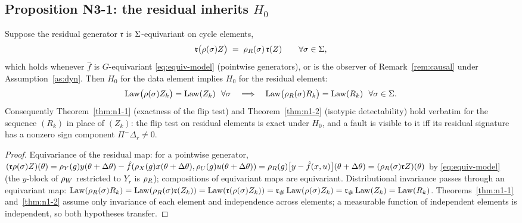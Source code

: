 \subsection{Proposition N3-1: the residual inherits \texorpdfstring{$H_0$}{H0}}
\label{sec:p2-n31}

\begin{proposition}
\label{prop:residual-h0}
Suppose the residual generator $\mathfrak{r}$ is $\Sigma$-equivariant on
cycle elements,
\begin{equation}
  \label{eq:r-equiv}
  \mathfrak{r}\bigl(\rho(\sigma) Z\bigr) \;=\; \rho_R(\sigma)\, \mathfrak{r}(Z)
  \qquad \forall \sigma \in \Sigma,
\end{equation}
which holds whenever $\hat f$ is $G$-equivariant \eqref{eq:equiv-model}
(pointwise generators), or is the observer of Remark~\ref{rem:causal} under
Assumption~\ref{as:dyn}. Then $H_0$ for the data element implies $H_0$ for
the residual element:
\begin{equation}
  \label{eq:h0-residual}
  \operatorname{Law}\bigl(\rho(\sigma) Z_k\bigr) = \operatorname{Law}(Z_k)\ \ \forall \sigma
  \quad\Longrightarrow\quad
  \operatorname{Law}\bigl(\rho_R(\sigma) R_k\bigr) = \operatorname{Law}(R_k)\ \ \forall \sigma \in \Sigma .
\end{equation}
Consequently Theorem~\ref{thm:n1-1} (exactness of the flip test) and
Theorem~\ref{thm:n1-2} (isotypic detectability) hold verbatim for the
sequence $(R_k)$ in place of $(Z_k)$: the flip test on residual elements is
exact under $H_0$, and a fault is visible to it iff its residual signature
has a nonzero sign component $\Pi^{-}\Delta_r \neq 0$.
\end{proposition}

\begin{proof}
Equivariance of the residual map: for a pointwise generator,
$(\mathfrak{r}\rho(\sigma)Z)(\theta) = \rho_{Y}(g) y(\theta+\Delta\theta) -
\hat f(\rho_{X}(g)x(\theta+\Delta\theta), \rho_{U}(g)u(\theta+\Delta\theta)) =
\rho_{R}(g)\bigl[y - \hat f(x,u)\bigr](\theta+\Delta\theta) =
(\rho_R(\sigma)\mathfrak{r}Z)(\theta)$ by \eqref{eq:equiv-model} (the
$y$-block of $\rho_{W}$ restricted to $Y_r$ is $\rho_{R}$); compositions of
equivariant maps are equivariant. Distributional invariance passes through
an equivariant map: $\operatorname{Law}(\rho_R(\sigma)R_k) = \operatorname{Law}(\rho_R(\sigma)\mathfrak{r}(Z_k))
= \operatorname{Law}(\mathfrak{r}(\rho(\sigma)Z_k)) = {\mathfrak{r}}_{\#}\operatorname{Law}(\rho(\sigma)Z_k)
= {\mathfrak{r}}_{\#}\operatorname{Law}(Z_k) = \operatorname{Law}(R_k)$. Theorems~\ref{thm:n1-1}
and~\ref{thm:n1-2} assume only invariance of each element and independence
across elements; a measurable function of independent elements is
independent, so both hypotheses transfer.
\end{proof}

